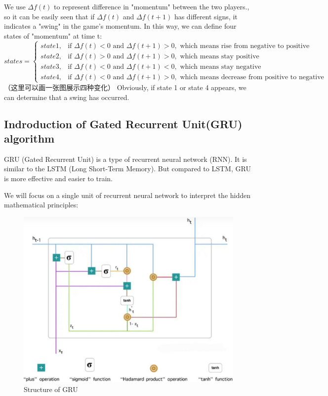 \documentclass[12pt, a4paper, oneside]{article}
\theoremstyle{break}
\begin{document}
We use $\Delta f(t)$ to represent difference in "momentum" between the two players., 
so it can be easily seen that if $\Delta f(t)$ and $\Delta f(t+1)$
has different signs, it indicates a "swing" in the game's momentum. 
In this way, we can define four states of "momentum" at time t:
$$states=\begin{cases}
    state1, &\text{if } \Delta f(t)<0 \text{ and } \Delta f(t+1)>0, \text{ which means rise from negative to positive}\\
    state2, &\text{if } \Delta f(t)>0 \text{ and } \Delta f(t+1)>0, \text{ which means stay positive}\\
    state3, &\text{if } \Delta f(t)<0 \text{ and } \Delta f(t+1)<0, \text{ which means stay negative}\\
    state4, &\text{if } \Delta f(t)<0 \text{ and } \Delta f(t+1)>0, \text{ which means decrease from positive to negative}
\end{cases}$$
（这里可以画一张图展示四种变化）
Obviously, if state 1 or state 4 appears, we can determine that a swing has occurred. 

\subsection{Indroduction of Gated Recurrent Unit(GRU) algorithm}

GRU (Gated Recurrent Unit) is a type of recurrent neural network (RNN). It is similar to the LSTM 
(Long Short-Term Memory). But compared to LSTM, GRU is more effective and easier to train.

We will focus on a single unit of recurrent neural network to interpret the hidden mathematical principles:
\begin{figure}[H]
    \centering
    \includegraphics[scale=0.15]{imgs/6.jpg}
    \caption{Structure of GRU}
\end{figure}
\end{document}
